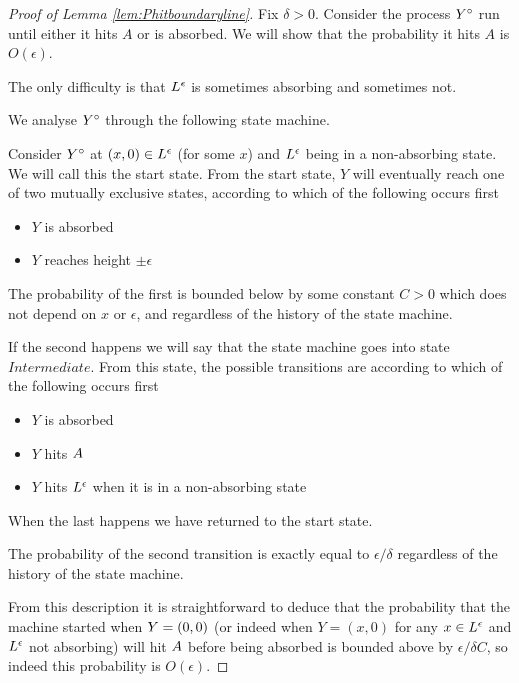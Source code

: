 {\begin{proof}[Proof of Lemma \ref{lem:Phitboundaryline}]
Fix $\delta > 0$.  Consider the process $Y^\circ$ run until either
it hits $A$ or is absorbed.  We will show that the probability it
hits $A$ is $O(\epsilon)$.

The only difficulty is that $L^\epsilon$ is sometimes absorbing and
sometimes not.

We analyse $Y^\circ$ through the following state machine.

Consider $Y^\circ$ at $(x,0) \in L^\epsilon$ (for some $x$) and $L^\epsilon$ being in
a non-absorbing state.  We will call this the start state.  From the
start state, $Y$ will eventually reach one of two mutually exclusive
states, according to which of the following occurs first

\newcommand{\intermediatelines}{I}

\begin{itemize}
\item $Y$ is absorbed
\item $Y$ reaches height $\pm\epsilon$
\end{itemize}

The probability of the first is bounded below by some constant $C > 0$
which does not depend on $x$ or $\epsilon$, and regardless of the
history of the state machine.

\newcommand{\stateintermediate}{Intermediate}

If the second happens we will say that the state machine goes into
state $\stateintermediate$.  From this state, the possible transitions
are according to which of the following occurs first

\begin{itemize}
\item $Y$ is absorbed
\item $Y$ hits $A$
\item $Y$ hits $L^\epsilon$ when it is in a non-absorbing state
\end{itemize}

When the last happens we have returned to the start state.

The probability of the second transition is exactly equal to
$\epsilon/\delta$ regardless of the history of the state machine.

From this description it is straightforward to deduce that the
probability that the machine started when $Y = (0,0)$ (or indeed when
$Y = (x, 0)$ for any $x \in L^\epsilon$ and $L^\epsilon$ not absorbing) will hit
$A$ before being absorbed is
bounded above by $\epsilon/\delta C$, so indeed this probability is
$O(\epsilon)$.
\end{proof}

}
